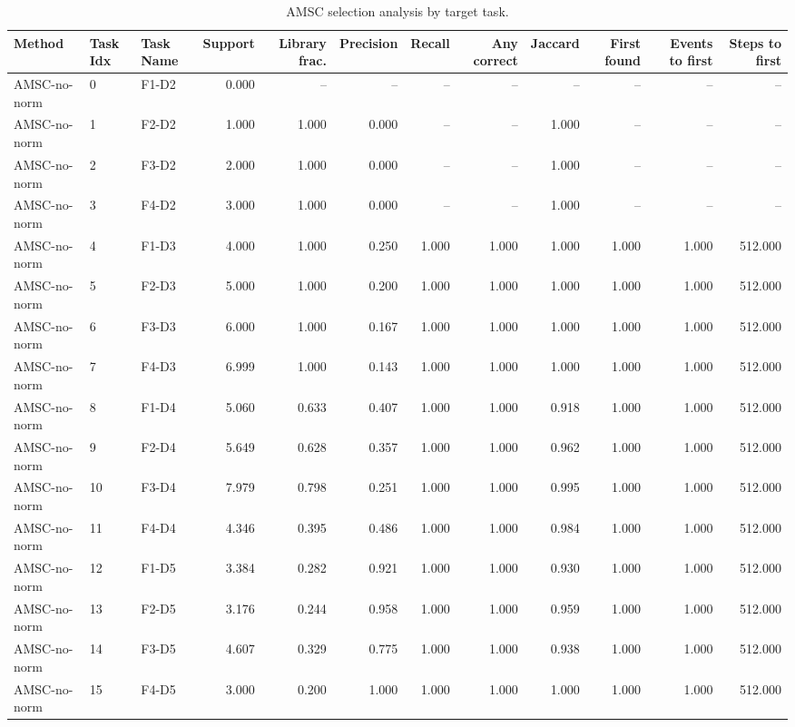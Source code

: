 \begin{table}[ht]
    \caption{AMSC selection analysis by target task.}
    \label{tbl:amsc_selection_task}
    \centering
    \scriptsize
    \begin{tabular}{lllrrrrrrrrr}
    \toprule
Method & Task Idx & Task Name & Support & Library frac. & Precision & Recall & Any correct & Jaccard & First found & Events to first & Steps to first \\
    \midrule
AMSC-no-norm & 0 & F1-D2 & 0.000 & -- & -- & -- & -- & -- & -- & -- & -- \\
AMSC-no-norm & 1 & F2-D2 & 1.000 & 1.000 & 0.000 & -- & -- & 1.000 & -- & -- & -- \\
AMSC-no-norm & 2 & F3-D2 & 2.000 & 1.000 & 0.000 & -- & -- & 1.000 & -- & -- & -- \\
AMSC-no-norm & 3 & F4-D2 & 3.000 & 1.000 & 0.000 & -- & -- & 1.000 & -- & -- & -- \\
AMSC-no-norm & 4 & F1-D3 & 4.000 & 1.000 & 0.250 & 1.000 & 1.000 & 1.000 & 1.000 & 1.000 & 512.000 \\
AMSC-no-norm & 5 & F2-D3 & 5.000 & 1.000 & 0.200 & 1.000 & 1.000 & 1.000 & 1.000 & 1.000 & 512.000 \\
AMSC-no-norm & 6 & F3-D3 & 6.000 & 1.000 & 0.167 & 1.000 & 1.000 & 1.000 & 1.000 & 1.000 & 512.000 \\
AMSC-no-norm & 7 & F4-D3 & 6.999 & 1.000 & 0.143 & 1.000 & 1.000 & 1.000 & 1.000 & 1.000 & 512.000 \\
AMSC-no-norm & 8 & F1-D4 & 5.060 & 0.633 & 0.407 & 1.000 & 1.000 & 0.918 & 1.000 & 1.000 & 512.000 \\
AMSC-no-norm & 9 & F2-D4 & 5.649 & 0.628 & 0.357 & 1.000 & 1.000 & 0.962 & 1.000 & 1.000 & 512.000 \\
AMSC-no-norm & 10 & F3-D4 & 7.979 & 0.798 & 0.251 & 1.000 & 1.000 & 0.995 & 1.000 & 1.000 & 512.000 \\
AMSC-no-norm & 11 & F4-D4 & 4.346 & 0.395 & 0.486 & 1.000 & 1.000 & 0.984 & 1.000 & 1.000 & 512.000 \\
AMSC-no-norm & 12 & F1-D5 & 3.384 & 0.282 & 0.921 & 1.000 & 1.000 & 0.930 & 1.000 & 1.000 & 512.000 \\
AMSC-no-norm & 13 & F2-D5 & 3.176 & 0.244 & 0.958 & 1.000 & 1.000 & 0.959 & 1.000 & 1.000 & 512.000 \\
AMSC-no-norm & 14 & F3-D5 & 4.607 & 0.329 & 0.775 & 1.000 & 1.000 & 0.938 & 1.000 & 1.000 & 512.000 \\
AMSC-no-norm & 15 & F4-D5 & 3.000 & 0.200 & 1.000 & 1.000 & 1.000 & 1.000 & 1.000 & 1.000 & 512.000 \\

\end{tabular}
\end{table}
